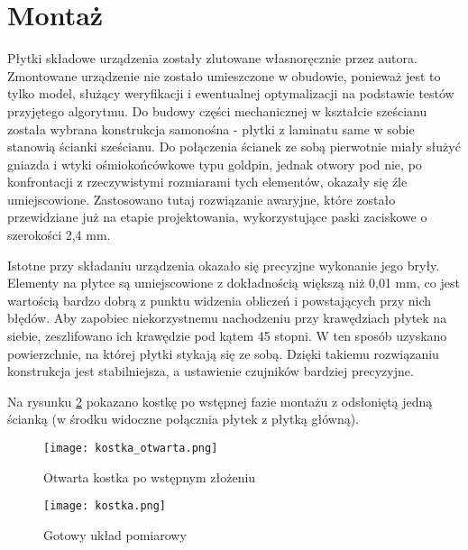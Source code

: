 \section{Montaż}
Płytki składowe urządzenia zostały zlutowane własnoręcznie przez autora.
Zmontowane urządzenie nie zostało umieszczone w obudowie, ponieważ jest to tylko model, służący weryfikacji i ewentualnej optymalizacji na podstawie testów przyjętego algorytmu. Do budowy części mechanicznej w kształcie sześcianu została wybrana konstrukcja samonośna - płytki z laminatu same w sobie stanowią ścianki sześcianu. Do połączenia ścianek ze sobą pierwotnie miały służyć gniazda i wtyki ośmiokońcówkowe typu goldpin, jednak otwory pod nie, po konfrontacji z rzeczywistymi rozmiarami tych elementów, okazały się źle umiejscowione. Zastosowano tutaj rozwiązanie awaryjne, które zostało przewidziane już na etapie projektowania, wykorzystujące paski zaciskowe o szerokości 2,4 mm.

Istotne przy składaniu urządzenia okazało się precyzjne wykonanie jego bryły. Elementy na płytce są umiejscowione z dokładnością większą niż 0,01 mm, co jest wartością bardzo dobrą z punktu widzenia obliczeń i powstających przy nich błędów. Aby zapobiec niekorzystnemu nachodzeniu przy krawędziach płytek na siebie, zeszlifowano ich krawędzie pod kątem 45 stopni. W ten sposób uzyskano powierzchnie, na której płytki stykają się ze sobą. Dzięki takiemu rozwiązaniu konstrukcja jest stabilniejsza, a ustawienie czujników bardziej precyzyjne.

Na rysunku \ref{kostka_otwarta} pokazano kostkę po wstępnej fazie montażu z odsłoniętą jedną ścianką (w środku widoczne połącznia płytek z płytką główną).

\begin{figure}[ht]
	\centering
	\texttt{[image: kostka\_otwarta.png]}
	\caption{Otwarta kostka po wstępnym złożeniu}
	\label{kostka_otwarta}
\end{figure}
\begin{figure}[ht]
	\centering
	\texttt{[image: kostka.png]}
	\caption{Gotowy układ pomiarowy}
	\label{kostka_otwarta}
\end{figure}
